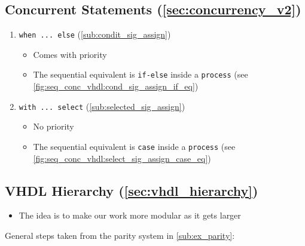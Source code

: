 \subsection{Concurrent Statements (\ref{sec:concurrency_v2})}

\begin{enumerate}

\item \verb|when ... else| (\ref{sub:condit_sig_assign})

	\begin{itemize}

	\item Comes with priority
	
	\item The sequential equivalent is \verb|if-else| inside a \verb|process| (see \autoref{fig:seq_conc_vhdl:cond_sig_assign_if_eq})

	\end{itemize}


\item \verb|with ... select| (\ref{sub:selected_sig_assign})

	\begin{itemize}
	\item No priority
	
	\item The sequential equivalent is \verb|case| inside a \verb|process| (see 		\autoref{fig:seq_conc_vhdl:select_sig_assign_case_eq})
	\end{itemize}		

\end{enumerate}

\subsection{VHDL Hierarchy (\ref{sec:vhdl_hierarchy})}

\begin{itemize}

\item The idea is to make our work more modular as it gets larger

\end{itemize}

General steps taken from the parity system in \ref{sub:ex_parity}:

